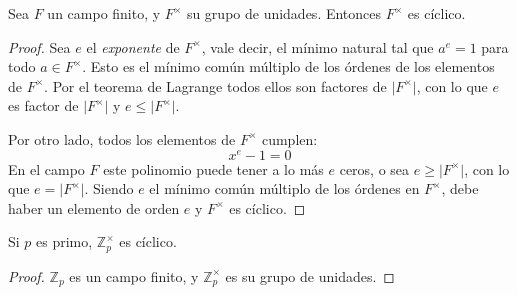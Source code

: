  \begin{theorem}
    \label{theo:F*-ciclico}
    Sea \(F\) un campo finito,%
    y \(F^\times\) su grupo de unidades.%
    Entonces \(F^\times\) es cíclico.%
  \end{theorem}
  \begin{proof}
    Sea \(e\) el \emph{exponente} de \(F^\times\),%
    vale decir,
    el mínimo natural
    tal que \(a^e = 1\) para todo \(a \in F^\times\).
    Esto es el mínimo común múltiplo
    de los órdenes de los elementos de \(F^\times\).
    Por el teorema de Lagrange%
    todos ellos son factores de \(\lvert F^\times \rvert\),
    con lo que \(e\) es factor de \(\lvert F^\times \rvert\)
    y \(e \le \lvert F^\times \rvert\).

    Por otro lado,
    todos los elementos de \(F^\times\) cumplen:
    \begin{equation*}
      x^e - 1
	= 0
    \end{equation*}
    En el campo \(F\)
    este polinomio puede tener a lo más \(e\) ceros,
    o sea \(e \ge \lvert F^\times \rvert\),
    con lo que \(e = \lvert F^\times \rvert\).
    Siendo \(e\) el mínimo común múltiplo
    de los órdenes en \(F^\times\),
    debe haber un elemento de orden \(e\)
    y \(F^\times\) es cíclico.
  \end{proof}

  \begin{corollary}
    \label{cor:Un-ciclico}
    Si \(p\) es primo,
    \(\mathbb{Z}^\times_p\) es cíclico.
  \end{corollary}
  \begin{proof}
    \(\mathbb{Z}_p\) es un campo finito,
    y \(\mathbb{Z}^\times_p\) es su grupo de unidades.
  \end{proof}

